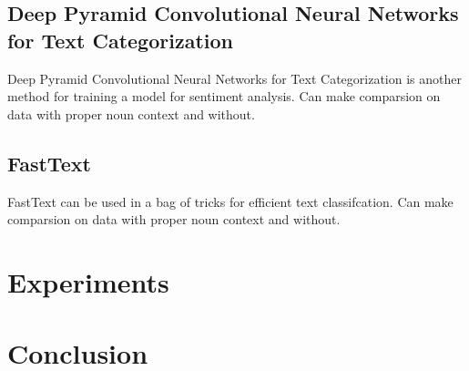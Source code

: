 \documentclass[11pt,a4paper]{article}
\begin{document}
\subsection{Deep Pyramid Convolutional Neural Networks for Text Categorization}

Deep Pyramid Convolutional Neural Networks for Text Categorization is another method for training a model for sentiment analysis. Can make comparsion on data with proper noun context and without.

\subsection{FastText}

FastText can be used in a bag of tricks for efficient text classifcation. Can make comparsion on data with proper noun context and without.

\section{Experiments}

\section{Conclusion}



\end{document}
